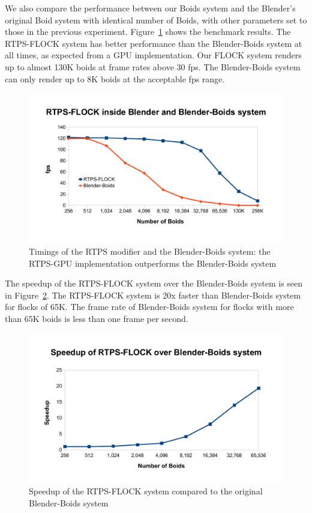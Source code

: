 We also compare the performance between our Boids system and the Blender's original Boid system with identical number of Boids, with other parameters set to those in the previous experiment. Figure~\ref{RTPSvsBlender} shows the benchmark results. The RTPS-FLOCK system has better performance than the Blender-Boids system at all times, as expected from a GPU implementation. Our FLOCK system renders up to almost 130K boids at frame rates above 30 fps. The Blender-Boids system can only render up to 8K boids at the acceptable fps range.

\begin{figure}[htbp]
\begin{center}
\includegraphics[scale=0.7]{figures/benchmarks.pdf}
\caption{Timings of the RTPS modifier and the Blender-Boids system: the RTPS-GPU implementation outperforms the Blender-Boids system}
\label{RTPSvsBlender}
\end{center}
\end{figure}

The speedup of the RTPS-FLOCK system over the Blender-Boids system is seen in Figure~\ref{speedup}. The RTPS-FLOCK system is 20x faster than Blender-Boids system for flocks of 65K. The frame rate of Blender-Boids system for flocks with more than 65K boids is less than one frame per second.

\begin{figure}[htbp]
\begin{center}
\includegraphics[scale=0.7]{figures/speedup.pdf}
\caption{Speedup of the RTPS-FLOCK system compared to the original Blender-Boids system}
\label{speedup}
\end{center}
\end{figure}


